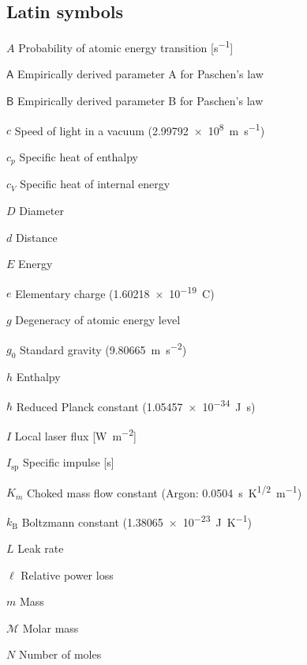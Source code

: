 \begin{multicols}{2}
    \section*{Latin symbols}
    \begin{nomlist}
        \item[$A$]              Probability of atomic energy transition [\unit{s^{-1}}]
        \item[$\mathsf{A}$]     Empirically derived parameter A for Paschen's law 
        \item[$\mathsf{B}$]     Empirically derived parameter B for Paschen's law 
        \item[$c$]              Speed of light in a vacuum (\qty{2.99792e8}{m.s^{-1}}) 
        \item[$c_p$]            Specific heat of enthalpy
        \item[$c_V$]            Specific heat of internal energy
        \item[$D$]              Diameter
        \item[$d$]              Distance
        \item[$E$]              Energy
        \item[$e$]              Elementary charge (\qty{1.60218e-19}{C})
        \item[$g$]              Degeneracy of atomic energy level
        \item[$g_0$]            Standard gravity (\qty{9.80665}{m.s^{-2}}) 
        \item[$h$]              Enthalpy
        \item[$\hbar$]          Reduced Planck constant (\qty{1.05457e-34}{J.s})
        \item[$I$]              Local laser flux [\unit{W.m^{-2}}]
        \item[$I_\text{sp}$]    Specific impulse [\unit{s}]
        \item[$K_{\dot{m}}$]    Choked mass flow constant (Argon: \qty{0.0504}{s.K^{1/2}.m^{-1}}) 
        \item[$k_\mathrm{B}$]   Boltzmann constant (\qty{1.38065e-23}{J.K^{-1}})
        \item[$L$]              Leak rate
        \item[$\ell$]           Relative power loss
        \item[$m$]              Mass
        \item[$\mathcal{M}$]    Molar mass
        \item[$N$]              Number of moles 

\end{nomlist}
\end{multicols}
